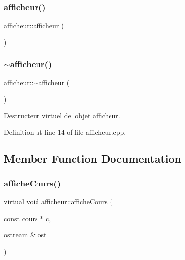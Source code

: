 \subsubsection{\texorpdfstring{afficheur()}{afficheur()}}
{\footnotesize\ttfamily afficheur\+::afficheur (\begin{DoxyParamCaption}{ }\end{DoxyParamCaption})\hspace{0.3cm}{\ttfamily [default]}}

\hypertarget{classafficheur_a093c44d15f6de24883abce836bfd11c9}{}\label{classafficheur_a093c44d15f6de24883abce836bfd11c9} 
\subsubsection{\texorpdfstring{$\sim$afficheur()}{~afficheur()}}
{\footnotesize\ttfamily afficheur\+::$\sim$afficheur (\begin{DoxyParamCaption}{ }\end{DoxyParamCaption})\hspace{0.3cm}{\ttfamily [virtual]}}



Destructeur virtuel de l\textquotesingle{}objet afficheur. 



Definition at line 14 of file afficheur.\+cpp.



\subsection{Member Function Documentation}
\hypertarget{classafficheur_a9d176576ad45c2a07a8a887b853b7edb}{}\label{classafficheur_a9d176576ad45c2a07a8a887b853b7edb} 
\subsubsection{\texorpdfstring{affiche\+Cours()}{afficheCours()}}
{\footnotesize\ttfamily virtual void afficheur\+::affiche\+Cours (\begin{DoxyParamCaption}\item[{const \hyperlink{classcours}{cours} $\ast$}]{c,  }\item[{ostream \&}]{ost }\end{DoxyParamCaption})\hspace{0.3cm}{\ttfamily [pure virtual]}}



